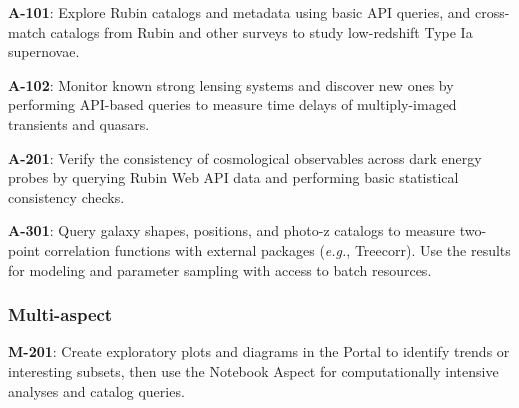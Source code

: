 \textbf{A-101}: Explore Rubin catalogs and metadata using basic API queries, and cross-match catalogs from Rubin and other surveys to study low-redshift Type Ia supernovae.

\textbf{A-102}: Monitor known strong lensing systems and discover new ones by performing API-based queries to measure time delays of multiply-imaged transients and quasars.

\textbf{A-201}: Verify the consistency of cosmological observables across dark energy probes by querying Rubin Web API data and performing basic statistical consistency checks.

\textbf{A-301}: Query galaxy shapes, positions, and photo-z catalogs to measure two-point correlation functions with external packages (\emph{e.g.}, Treecorr). Use the results for modeling and parameter sampling with access to batch resources.

\subsubsection{Multi-aspect}

\textbf{M-201}: Create exploratory plots and diagrams in the Portal to identify trends or interesting subsets, then use the Notebook Aspect for computationally intensive analyses and catalog queries.
